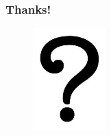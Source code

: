 \documentclass[12pt]{beamer}
\begin{document}
	\begin{frame}
		\frametitle{Thanks!}
		
		\begin{figure}
			\centering
			\includegraphics[width = 0.25\textwidth]{plots/question.jpg}
		\end{figure}
		
	\end{frame}
\end{document}
